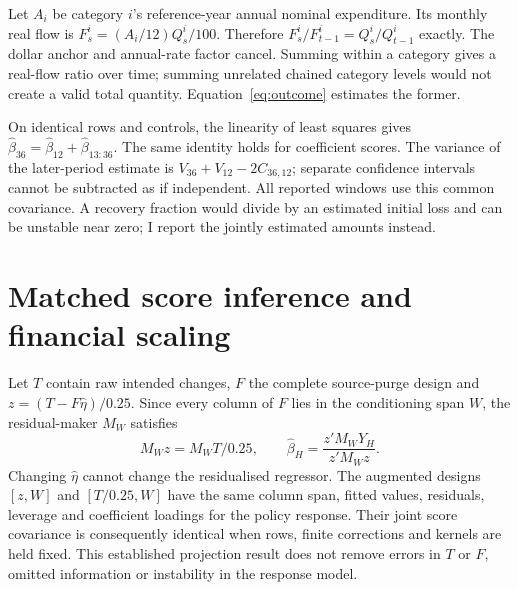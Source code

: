 \documentclass[11pt,a4paper]{article}
\begin{document}
Let $A_i$ be category $i$'s reference-year annual nominal expenditure. Its monthly real flow is $F^i_s=(A_i/12)Q^i_s/100$. Therefore $F^i_s/F^i_{t-1}=Q^i_s/Q^i_{t-1}$ exactly. The dollar anchor and annual-rate factor cancel. Summing within a category gives a real-flow ratio over time; summing unrelated chained category levels would not create a valid total quantity. Equation~\eqref{eq:outcome} estimates the former.

On identical rows and controls, the linearity of least squares gives $\widehat\beta_{36}=\widehat\beta_{12}+\widehat\beta_{13:36}$. The same identity holds for coefficient scores. The variance of the later-period estimate is $V_{36}+V_{12}-2C_{36,12}$; separate confidence intervals cannot be subtracted as if independent. All reported windows use this common covariance. A recovery fraction would divide by an estimated initial loss and can be unstable near zero; I report the jointly estimated amounts instead.

\section{Matched score inference and financial scaling}
\label{app:inference}

Let $T$ contain raw intended changes, $F$ the complete source-purge design and $z=(T-F\widehat\eta)/0.25$. Since every column of $F$ lies in the conditioning span $W$, the residual-maker $M_W$ satisfies
\begin{equation}
 M_Wz=M_WT/0.25,\qquad
 \widehat\beta_H=\frac{z'M_WY_H}{z'M_Wz}.\label{eq:fwl}
\end{equation}
Changing $\widehat\eta$ cannot change the residualised regressor. The augmented designs $[z,W]$ and $[T/0.25,W]$ have the same column span, fitted values, residuals, leverage and coefficient loadings for the policy response. Their joint score covariance is consequently identical when rows, finite corrections and kernels are held fixed. This established projection result \citep{Ding2021} does not remove errors in $T$ or $F$, omitted information or instability in the response model.
\end{document}
